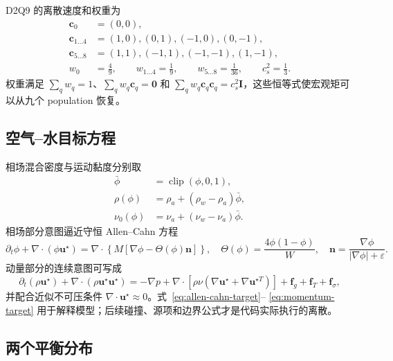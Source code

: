 \documentclass[UTF8,zihao=-4]{ctexart}
\newcommand{\vect}[1]{\boldsymbol{#1}}
\newcommand{\clip}{\operatorname{clip}}
\numberwithin{equation}{section}
\begin{document}
D2Q9 的离散速度和权重为
\begin{align}
  \vect c_0&=(0,0),\\
  \vect c_{1\ldots4}&=(1,0),(0,1),(-1,0),(0,-1),\\
  \vect c_{5\ldots8}&=(1,1),(-1,1),(-1,-1),(1,-1),\\
  w_0&=\frac49,\qquad w_{1\ldots4}=\frac19,
  \qquad w_{5\ldots8}=\frac1{36},\qquad c_s^2=\frac13.
  \label{eq:d2q9}
\end{align}
权重满足 $\sum_qw_q=1$、$\sum_qw_q\vect c_q=\vect0$ 和
$\sum_qw_q\vect c_q\vect c_q=c_s^2\vect I$，这些恒等式使宏观矩可以从九个 population 恢复。

\subsection{空气--水目标方程}

相场混合密度与运动黏度分别取
\begin{align}
  \bar\phi&=\clip(\phi,0,1),\\
  \rho(\phi)&=\rho_a+(\rho_w-\rho_a)\bar\phi,\\
  \nu_0(\phi)&=\nu_a+(\nu_w-\nu_a)\bar\phi.
  \label{eq:mixture-properties}
\end{align}
相场部分意图逼近守恒 Allen--Cahn 方程
\begin{equation}
  \partial_t\phi+\nabla\cdot(\phi\vect u^\star)
  =\nabla\cdot\left\{M\left[\nabla\phi-\Theta(\phi)\vect n\right]\right\},
  \quad
  \Theta(\phi)=\frac{4\phi(1-\phi)}{W},
  \quad
  \vect n=\frac{\nabla\phi}{|\nabla\phi|+\varepsilon}.
  \label{eq:allen-cahn-target}
\end{equation}
动量部分的连续意图可写成
\begin{equation}
  \partial_t(\rho\vect u^\star)+\nabla\cdot(\rho\vect u^\star\vect u^\star)
  =-\nabla p+\nabla\cdot[\rho\nu(\nabla\vect u^\star+\nabla\vect u^{\star T})]
  +\vect f_g+\vect f_T+\vect f_\sigma,
  \label{eq:momentum-target}
\end{equation}
并配合近似不可压条件 $\nabla\cdot\vect u^\star\approx0$。式~\eqref{eq:allen-cahn-target}--
\eqref{eq:momentum-target} 用于解释模型；后续碰撞、源项和边界公式才是代码实际执行的离散。

\subsection{两个平衡分布}
\end{document}
